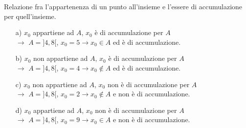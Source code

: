 \begin{esempio}
Relazione fra l'appartenenza di un punto all'insieme e l'essere di 
accumulazione per quell'insieme.
\begin{itemize}
  \item[a)] \(x_0\) appartiene ad \(A\), \(x_0\) è di accumulazione per \(A\)\\
 \(\longrightarrow\) \(A=]4,8[\), \(x_0=5\rightarrow x_0\in A\) ed è di 
accumulazione.
  \item[b)]  \(x_0\) non appartiene ad \(A\), \(x_0\) è di accumulazione per 
\(A\)\\
 \(\longrightarrow\) \(A=]4,8[\), \(x_0=4\rightarrow x_0\notin A\) ed è di 
accumulazione.
  \item[c)]  \(x_0\) non appartiene ad \(A\), \(x_0\) non è di accumulazione 
per \(A\)\\
 \(\longrightarrow\) \(A=]4,8[\), \(x_0=2\rightarrow x_0\notin A\) e non è di 
accumulazione.
  \item[d)] \(x_0\) appartiene ad \(A\), \(x_0\) non è di accumulazione per 
\(A\)\\
  \(\longrightarrow\) \(A=]4,8[\), \(x_0=9\rightarrow x_0\in A\) e non 
è di accumulazione.
\end{itemize}
\end{esempio}

